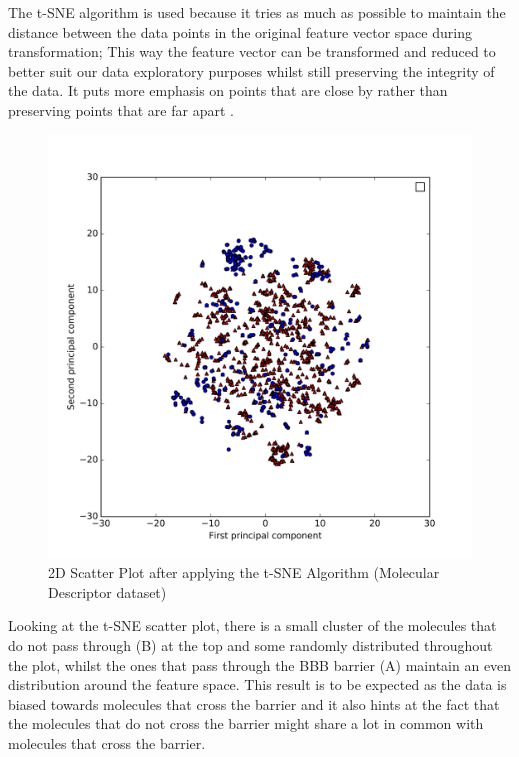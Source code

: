 \documentclass[a4paper,12pt]{report}
\begin{document}
		The t-SNE algorithm is used because it tries as much as possible to maintain the distance between the data points in the original feature vector space during transformation; This way the feature vector can be transformed and reduced to better suit our data exploratory purposes whilst still preserving the integrity of the data. It puts more emphasis on points that are close by rather than preserving points that are far apart \cite{Mueller2016}.
		\begin{figure}[H]
			\centering
			\includegraphics[width=\textwidth,scale=1,totalheight=0.4\textheight]{images/scatter_tsne}
			\caption{2D Scatter Plot after applying the t-SNE Algorithm (Molecular Descriptor dataset)}
			\label{fig:scatter_tsne_2D}
		\end{figure}
		Looking at the t-SNE scatter plot, there is a small cluster of the molecules that do not pass through (B) at the top and some randomly distributed throughout the plot, whilst the ones that pass through the BBB barrier (A) maintain an even distribution around the feature space. This result is to be expected as the data is biased towards molecules that cross the barrier and it also hints at the fact that the molecules that do not cross the barrier might share a lot in common with molecules that cross the barrier.
\end{document}
